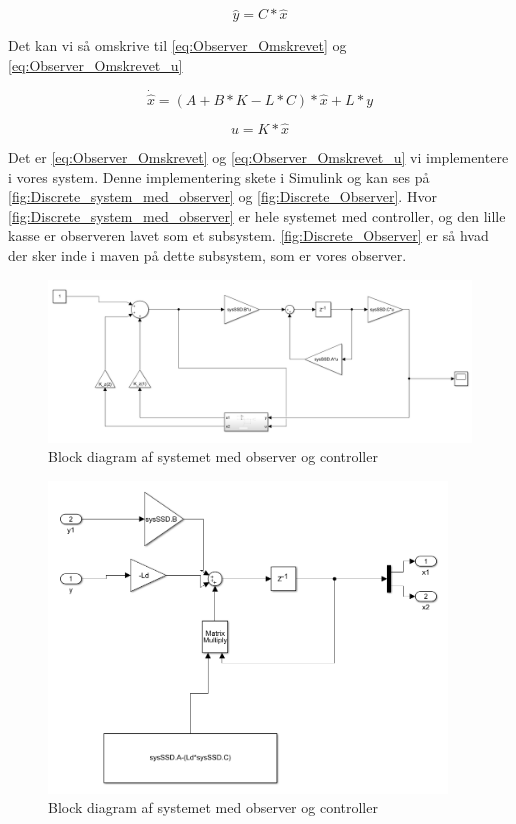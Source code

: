 \begin{equation}
\hat{y} = C * \hat{x}
\label{eq:Observer_stateSpace_C_L}
\end{equation}

Det kan vi så omskrive til \autoref{eq:Observer_Omskrevet} og \autoref{eq:Observer_Omskrevet_u}

\begin{equation}
\dot{\hat{x}} = (A + B * K - L * C) * \hat{x} + L * y
\label{eq:Observer_Omskrevet}
\end{equation}

\begin{equation}
u =  K * \hat{x}
\label{eq:Observer_Omskrevet_u}
\end{equation}

Det er \autoref{eq:Observer_Omskrevet} og \autoref{eq:Observer_Omskrevet_u} vi implementere i vores system. Denne implementering skete i Simulink og kan ses på \autoref{fig:Discrete_system_med_observer} og \autoref{fig:Discrete_Observer}. Hvor \autoref{fig:Discrete_system_med_observer} er hele systemet med controller, og den lille kasse er observeren lavet som et subsystem. \autoref{fig:Discrete_Observer} er så hvad der sker inde i maven på dette subsystem, som er vores observer.


\begin{figure}[H]
	\centering
	\includegraphics[width = 400pt]{Img/Discrete_system_med_observer.png}
	\caption{Block diagram af systemet med observer og controller}
	\label{fig:Discrete_system_med_observer}
\end{figure}

\begin{figure}[H]
	\centering
	\includegraphics[width = 300pt]{Img/Discrete_Observer.png}
	\caption{Block diagram af systemet med observer og controller}
	\label{fig:Discrete_Observer}
\end{figure}

